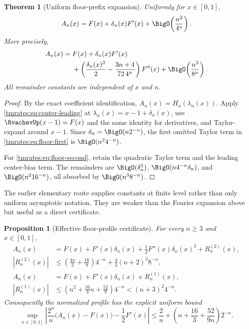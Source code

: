 \documentclass[11pt,oneside]{article}
\newtheorem{theorem}{Theorem}[section]
\newtheorem{proposition}[proposition]{Proposition}
\theoremstyle{definition}
\theoremstyle{remark}
\begin{document}
\begin{theorem}[Uniform floor-prefix expansion]
\label{tmrates:thm:floor-expansion}
Uniformly for $x\in[0,1]$,
\begin{equation}
 A_n(x)
 =F(x)+\delta_n(x)F'(x)
  +\BigO\!\left(\frac{n^2}{4^n}\right).                  \label{tmrates:eq:floor-first}
\end{equation}
More precisely,
\begin{align}
 A_n(x)
={}&F(x)+\delta_n(x)F'(x) \notag\\
 &+\left(
    \frac{\delta_n(x)^2}{2}
    -\frac{3n+4}{72\,4^n}
   \right)F''(x)
 +\BigO\!\left(\frac{n^3}{8^n}\right).                  \label{tmrates:eq:floor-second}
\end{align}
All remainder constants are independent of $x$ and $n$.
\end{theorem}

\begin{proof}
By the exact coefficient identification,
$A_n(x)=H_n(\lambda_n(x))$.  Apply \eqref{tmrates:eq:center-leading} at
$\lambda_n(x)=x-1+\delta_n(x)$, use $\RvachevUp(x-1)=F(x)$ and the same identity for derivatives,
and Taylor-expand around $x-1$.  Since $\delta_n=\BigO(n2^{-n})$, the first omitted Taylor
term in \eqref{tmrates:eq:floor-first} is $\BigO(n^2 4^{-n})$.

For \eqref{tmrates:eq:floor-second}, retain the quadratic Taylor term and the leading center-bias
term.  The remainders are
$\BigO(\delta_n^3)$, $\BigO(n4^{-n}\delta_n)$, and
$\BigO(n^2 16^{-n})$, all absorbed by $\BigO(n^3 8^{-n})$.
\end{proof}

The earlier elementary route supplies constants at finite level rather than only uniform
asymptotic notation.  They are weaker than the Fourier expansion above but useful as a
direct certificate.

\begin{proposition}[Effective floor-profile certificate]
\label{tmrates:prop:effective-floor-certificate}
For every \(n\geq3\) and \(x\in[0,1]\),
\begin{align}
 A_n(x)&=F(x)+F'(x)\delta_n(x)+\frac12F''(x)\delta_n(x)^2
          +R^{(2)}_n(x),\label{tmrates:eq:effective-second-order}\\
 |R^{(2)}_n(x)|&\leq
 \left(\frac{4n}{3}+\frac{16}{9}\right)4^{-n}
 +\frac43(n+2)^3 8^{-n},\label{tmrates:eq:effective-second-order-remainder}\\
 A_n(x)&=F(x)+F'(x)\delta_n(x)+R^{(1)}_n(x),\label{tmrates:eq:effective-first-order}\\
 |R^{(1)}_n(x)|&\leq
 \left(n^2+\frac{16}{3}n+\frac{52}{9}\right)4^{-n}
 <(n+3)^2 4^{-n}.\label{tmrates:eq:effective-first-order-remainder}
\end{align}
Consequently the normalized profile has the explicit uniform bound
\begin{equation}
 \sup_{x\in[0,1]}
 \left|\frac{2^n}{n}\bigl(A_n(x)-F(x)\bigr)-\frac12F'(x)\right|
 \leq \frac2n+
 \left(n+\frac{16}{3}+\frac{52}{9n}\right)2^{-n}.
 \label{tmrates:eq:effective-uniform-profile-bound}
\end{equation}
\end{proposition}
\end{document}
